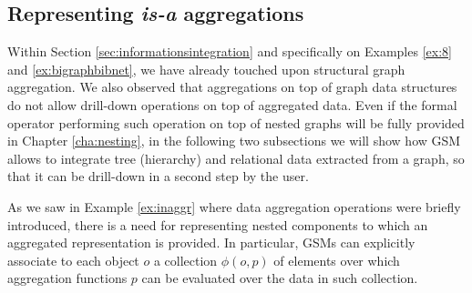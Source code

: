 
\subsection{Representing \textit{is-a} aggregations}\label{subsec:representingisa}

Within Section \vref{sec:informationsintegration} and specifically on Examples \ref{ex:8} and \ref{ex:bigraphbibnet}, we have already touched upon structural graph aggregation. We also observed that aggregations on top of graph data structures do not allow drill-down operations on top of aggregated data. Even if the formal operator performing such operation on top of nested graphs will be fully provided in Chapter \vref{cha:nesting}, in the following two subsections we will show how GSM allows to integrate tree (hierarchy) and relational data extracted from a graph, so that it can be drill-down in a second step by the user.

As we  saw in Example \vref{ex:inaggr} where data aggregation operations were briefly introduced, there is a need for representing nested components to which an aggregated representation is provided. In particular, GSMs can explicitly associate to each object $o$ a collection $\phi(o,p)$ of elements over which aggregation functions $p$ can be evaluated over the data in such collection.


